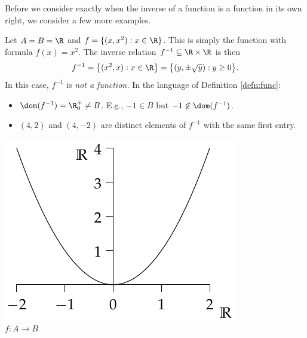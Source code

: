 \noindent Before we consider exactly when the inverse of a function is a function in its own right, we consider a few more examples.


\begin{examples}
\item\label{ex:reln1} Let $A=B=\R$ and $f=\{(x,x^2):x\in\R\}$. This is simply the function with formula $f(x)=x^2$. The inverse relation $f^{-1}\subseteq\R\times\R$ is then
\[f^{-1}=\bigl\{(x^2,x):x\in\R\bigr\}=\bigl\{(y,\pm\sqrt y):y\ge 0\bigr\}.\]
In this case, $f^{-1}$ is \emph{not a function.} In the language of Definition \ref{defn:func}:
\begin{itemize}
  \item $\dom(f^{-1})=\R^+_0\neq B$. E.g., $-1\in B$ but $-1\not\in\dom(f^{-1})$.
  \item $(4,2)$ and $(4,-2)$ are distinct elements of $f^{-1}$ with the same first entry.
\end{itemize}
\begin{center}
\begin{minipage}{0.35\textwidth}\centering
\includegraphics[width=\textwidth]{relations-20-reln2}\\
$f:A\to B$
\end{minipage}\qquad\qquad\qquad
\begin{minipage}{0.35\textwidth}\centering

\end{minipage}
\end{center}
\end{examples}
